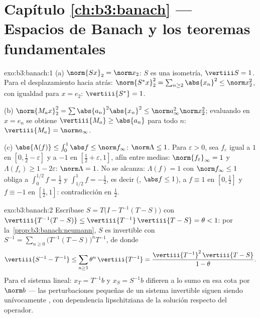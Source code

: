 \section*{Capítulo \ref{ch:b3:banach} --- Espacios de Banach y los
teoremas fundamentales}

\begin{solution}{exo:b3:banach:1}
(a) $\norm{Sx}_2 = \norm x_2$: $S$ es una isometría, $\vertiii S =
1$. Para el desplazamiento hacia atrás: $\norm{S^*x}_2^2 = \sum_{n \geq
2}\abs{x_n}^2 \leq \norm x_2^2$, con igualdad para $x = e_2$:
$\vertiii{S^*} = 1$.

(b) $\norm{M_ax}_2^2 = \sum\abs{a_n}^2\abs{x_n}^2 \leq \norm
a_\infty^2\norm x_2^2$; evaluando en $x = e_n$ se obtiene $\vertiii{M_a}
\geq \abs{a_n}$ para todo $n$: $\vertiii{M_a} = \norm a_\infty$.

(c) $\abs{\Lambda(f)} \leq \int_0^1\abs f \leq \norm f_\infty$:
$\norm\Lambda \leq 1$. Para $\varepsilon > 0$, sea $f_\varepsilon$ igual
a $1$ en $[0, \frac12 - \varepsilon]$ y a $-1$ en $[\frac12 +
\varepsilon, 1]$, afín entre medias: $\norm{f_\varepsilon}_\infty =
1$ y $\Lambda(f_\varepsilon) \geq 1 - 2\varepsilon$: $\norm\Lambda = 1$.
No se alcanza: $\Lambda(f) = 1$ con $\norm
f_\infty \leq 1$ obliga a $\int_0^{1/2}f = \frac12$ y
$\int_{1/2}^1 f = -\frac12$, es decir
(, $\abs f \leq 1$), a
$f \equiv 1$ en $[0, \frac12]$ y $f \equiv -1$ en $[\frac12,
1]$: contradicción en $\frac12$.
\end{solution}

\begin{solution}{exo:b3:banach:2}
Escríbase $S = T\bigl(I - T^{-1}(T - S)\bigr)$ con
$\vertiii{T^{-1}(T-S)} \leq \vertiii{T^{-1}}\,\vertiii{T - S} =
\theta < 1$: por la~\cref{prop:b3:banach:neumann}, $S$ es invertible con
$S^{-1} = \sum_{n\geq0}\bigl(T^{-1}(T -
S)\bigr)^nT^{-1}$, de donde
\[
\vertiii{S^{-1} - T^{-1}} \leq
\sum_{n\geq1}\theta^n\,\vertiii{T^{-1}}
= \frac{\vertiii{T^{-1}}^2\,\vertiii{T - S}}{1 - \theta}.
\]
Para el sistema lineal: $x_T = T^{-1}b$ y $x_S = S^{-1}b$ difieren a lo
sumo en esa cota por $\norm b$ --- las perturbaciones pequeñas de un
sistema invertible siguen siendo unívocamente
, con dependencia
lipschitziana de la solución respecto del operador.
\end{solution}

